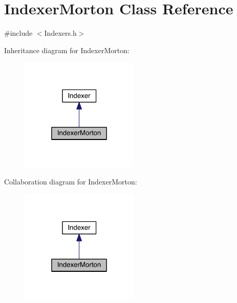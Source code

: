 \hypertarget{class_indexer_morton}{}\section{Indexer\+Morton Class Reference}
\label{class_indexer_morton}


{\ttfamily \#include $<$Indexers.\+h$>$}



Inheritance diagram for Indexer\+Morton\+:\nopagebreak
\begin{figure}[H]
\begin{center}
\leavevmode
\includegraphics[width=160pt]{d0/d54/class_indexer_morton__inherit__graph}
\end{center}
\end{figure}


Collaboration diagram for Indexer\+Morton\+:\nopagebreak
\begin{figure}[H]
\begin{center}
\leavevmode
\includegraphics[width=160pt]{d1/d1f/class_indexer_morton__coll__graph}
\end{center}
\end{figure}
